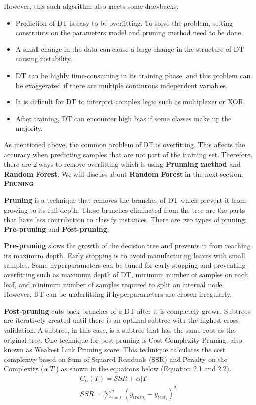 \documentclass[a4paper, 12pt]{report}
\begin{document}
However, this such algorithm also meets some drawbacks:
\begin{itemize}
    \item Prediction of DT is easy to be overfitting. To solve the problem, setting constraints on the parameters model and pruning method need to be done.
    \item A small change in the data can cause a large change in the structure of DT causing instability.
    \item DT can be highly time-consuming in its training phase, and this problem can be exaggerated if there are multiple continuous independent variables.
    \item It is difficult for DT to interpret complex logic such as multiplexer or XOR.
   \item After training, DT can encounter high bias if some classes make up the majority.
\end{itemize}
As mentioned above, the common problem of DT is overfitting. This affects the accuracy when predicting samples that are not part of the training set. Therefore, there are 2 ways to remove overfitting which is using \textbf{Prunning method} and \textbf{Random Forest}. We will discuss about \textbf{Random Forest} in the next section.
\\

\textsc{\textbf{Pruning}}

\textbf{Pruning} is a technique that removes the branches of DT which prevent it from growing to its full depth. These branches eliminated from the tree are the parts that  have less contribution to classify instances. There are two types of pruning: \textbf{Pre-pruning} and \textbf{Post-pruning}.

\textbf{Pre-pruning} slows the growth of the decision tree and prevents it from reaching its maximum depth. Early stopping is to avoid manufacturing leaves with small samples. Some hyperparameters  can be tuned for early stopping and preventing overfitting such as maximum depth of DT, minimum number of samples on each leaf, and minimum number of samples required to split an internal node. However, DT can be underfitting if hyperparameters are chosen irregularly.

\textbf{Post-pruning} cuts back branches of a DT after it is completely grown. Subtrees are iteratively created until there is an optimal subtree with the highest cross-validation. A subtree, in this case, is a subtree that has the same root as the original tree. One technique for post-pruning is Cost Complexity Pruning, also known as Weakest Link Pruning score. This technique calculates the cost complexity based on Sum of Squared Residuals (SSR) and Penalty on the Complexity ($\alpha |T|$) as shown in the equations below (Equation 2.1 and 2.2). 
\begin{align}
C_\alpha(T) = SSR + \alpha |T|\\
SSR = \sum_{i=1}^n (y_{train_i} - y_{test_i})^2
\end{align}
\end{document}
